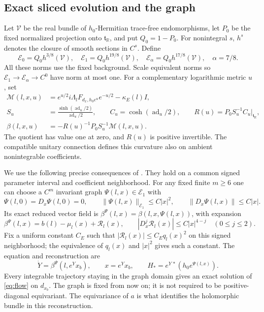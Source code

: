 \documentclass[11pt]{amsart}
\theoremstyle{definition}
\theoremstyle{remark}
\newcommand{\RR}{\mathbb R}
\newcommand{\ad}{\operatorname{ad}}
\begin{document}
\subsection{Exact sliced evolution and the graph}
Let $\mathcal V$ be the real bundle of $h_0$-Hermitian
trace-free endomorphisms, let $P_0$ be the fixed normalized
projection onto $\mathfrak t_{\RR}$, and put $Q_0=1-P_0$.
For nonintegral $s$, $h^s$ denotes the closure of smooth
sections in $C^s$. Define
\[
 \mathcal E_0=Q_0h^{3/8}(\mathcal V),\quad
 \mathcal E_1=Q_0h^{19/8}(\mathcal V),\quad
 \mathcal E_\alpha=Q_0h^{17/8}(\mathcal V),\quad \alpha=7/8.
\]
All these norms use the fixed background. Scale equivalent norms
so $\mathcal E_1\to\mathcal E_\alpha\to C^0$ have norm at most one.
For a complementary logarithmic metric $u$, set
\begin{equation}\label{eq:exact-field}
 \begin{aligned}
 \mathcal M(l,x,u)&=e^{u/2}i\Lambda_lF_{d_x,h_0e^u}e^{-u/2}
                                      -\kappa_E(l)I,\\
 S_u&=\frac{\sinh(\ad_u/2)}{\ad_u/2},\qquad
 C_u=\cosh(\ad_u/2),\qquad
 R(u)=P_0S_u^{-1}C_u|_{\mathfrak t_{\RR}},\\
 \beta(l,x,u)&=-R(u)^{-1}P_0S_u^{-1}\mathcal M(l,x,u).
 \end{aligned}
\end{equation}
The quotient has value one at zero, and $R(u)$ is positive
invertible. The compatible unitary connection defines this
curvature also on ambient nonintegrable coefficients.

We use the following precise consequences of
\cite[Sections 3, 4 and 7]{WuebbenPhase26}. They hold on a common
signed parameter interval and coefficient neighborhood.
For any fixed finite $m\ge6$ one can choose a $C^m$ invariant
graph $\Psi(l,x)\in\mathcal E_1$ with
\begin{equation}\label{eq:graph-bounds}
 \Psi(l,0)=D_x\Psi(l,0)=0,\qquad
 \|\Psi(l,x)\|_{\mathcal E_1}\le C|x|^2,\qquad
 \|D_x\Psi(l,x)\|\le C|x|.
\end{equation}
Its exact reduced vector field is $\beta^\Psi(l,x)=\beta(l,x,\Psi(l,x))$,
with expansion
\begin{equation}\label{eq:field-jet}
 \beta^\Psi(l,x)=b(l)-\mu_l(x)+\mathcal R_l(x),\qquad
 |D_x^j\mathcal R_l(x)|\le C|x|^{4-j}\quad(0\le j\le2).
\end{equation}
Fix a uniform constant $C_E$ such that
$|\mathcal R_l(x)|\le C_Eq_l(x)^2$ on this signed neighborhood;
the equivalence of $q_l(x)$ and $|x|^2$ gives such a constant.
The equation and reconstruction are
\begin{equation}\label{eq:finite-flow}
 \dot Y=\beta^\Psi(l,e^Yx_b),\qquad x=e^Yx_b,\qquad
 H_*=e^{Y\,*}(h_0e^{\Psi(l,x)}).
\end{equation}
Every integrable trajectory staying in the graph domain gives
an exact solution of \eqref{eq:flow} on $d_{x_b}$.
The graph is fixed from now on; it is not required to be
positive-diagonal equivariant. The equivariance of $a$ is what
identifies the holomorphic bundle in this reconstruction.
\end{document}
